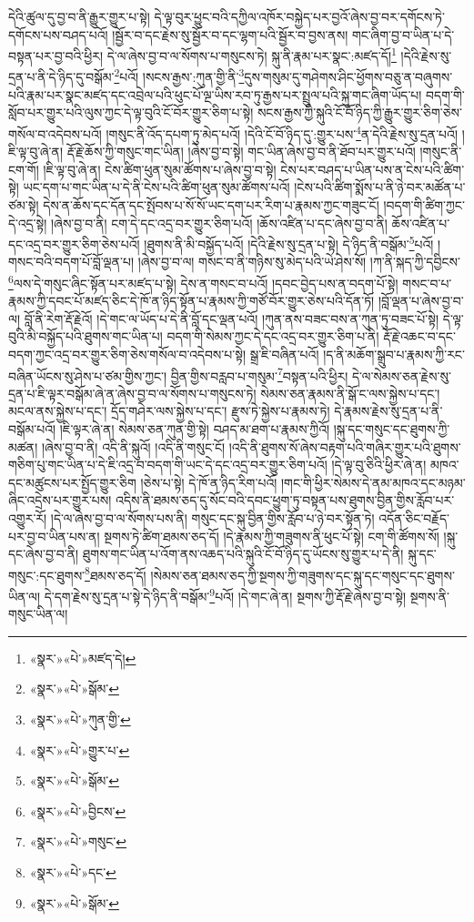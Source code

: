 དེའི་ཚུལ་དུ་བྱ་བ་ནི་རྒྱུར་གྱུར་པ་སྟེ། དེ་ལྟ་བུར་ཕྱུང་བའི་དཀྱིལ་འཁོར་བསྐྱེད་པར་བྱའོ་ཞེས་བྱ་བར་དགོངས་ཏེ་དགོངས་པས་བཤད་པའོ། །སྦྱོར་བ་དང་རྗེས་སུ་སྦྱོར་བ་དང་ལྷག་པའི་སྦྱོར་བ་བྱས་ནས། གང་ཞིག་བྱ་བ་ཡིན་པ་དེ་བསྟན་པར་བྱ་བའི་ཕྱིར། དེ་ལ་ཞེས་བྱ་བ་ལ་སོགས་པ་གསུངས་ཏེ། སྐུ་ནི་རྣམ་པར་སྣང་:མཛད་དོ།\footnote{«སྣར་»«པེ་»མཛད་དེ།} །དེའི་རྗེས་སུ་དྲན་པ་ནི་དེ་ཉིད་དུ་བསྒོམ་\footnote{«སྣར་»«པེ་»སྒོམ་}པའོ། །སངས་རྒྱས་:ཀུན་གྱི་ནི་\footnote{«སྣར་»«པེ་»ཀུན་གྱི་}དུས་གསུམ་དུ་གཤེགས་ཤིང་ཕྱོགས་བཅུ་ན་བཞུགས་པའི་རྣམ་པར་སྣང་མཛད་དང་འབྲེལ་པའི་ཕུང་པོ་ལྔ་ཡིས་རབ་ཏུ་རྒྱས་པར་སྤྲུལ་པའི་སྐུ་གང་ཞིག་ཡོད་པ། བདག་གི་སློབ་པར་གྱུར་པའི་ལུས་ཀྱང་དེ་ལྟ་བུའི་ངོ་བོར་གྱུར་ཅིག་པ་སྟེ། སངས་རྒྱས་ཀྱི་སྐུའི་ངོ་བོ་ཉིད་ཀྱི་རྒྱུར་གྱུར་ཅིག་ཅེས་གསོལ་བ་འདེབས་པའོ། །གསུང་ནི་འོད་དཔག་ཏུ་མེད་པའོ། །དེའི་ངོ་བོ་ཉིད་དུ་:གྱུར་པས་\footnote{«སྣར་»«པེ་»གྱུར་པ་}ན་དེའི་རྗེས་སུ་དྲན་པའོ། །ཇི་ལྟ་བུ་ཞེ་ན། རྡོ་རྗེ་ཆོས་ཀྱི་གསུང་གང་ཡིན། །ཞེས་བྱ་བ་སྟེ། གང་ཡིན་ཞེས་བྱ་བ་ནི་ཐོབ་པར་གྱུར་པའོ། །གསུང་ནི་ངག་གོ། །ཇི་ལྟ་བུ་ཞེ་ན། ངེས་ཚིག་ཕུན་སུམ་ཚོགས་པ་ཞེས་བྱ་བ་སྟེ། ངེས་པར་བཤད་པ་ཡིན་པས་ན་ངེས་པའི་ཚིག་སྟེ། ཡང་དག་པ་གང་ཡིན་པ་དེ་ནི་ངེས་པའི་ཚིག་ཕུན་སུམ་ཚོགས་པའོ། །ངེས་པའི་ཚིག་སྨོས་པ་ནི་ཉེ་བར་མཚོན་པ་ཙམ་སྟེ། དེས་ན་ཆོས་དང་དོན་དང་སྤོབས་པ་སོ་སོ་ཡང་དག་པར་རིག་པ་རྣམས་ཀྱང་གཟུང་ངོ། །བདག་གི་ཚིག་ཀྱང་དེ་འདྲ་སྟེ། །ཞེས་བྱ་བ་ནི། ངག་དེ་དང་འདྲ་བར་གྱུར་ཅིག་པའོ། །ཆོས་འཛིན་པ་དང་ཞེས་བྱ་བ་ནི། ཆོས་འཛིན་པ་དང་འདྲ་བར་གྱུར་ཅིག་ཅེས་པའོ། །ཐུགས་ནི་མི་བསྐྱོད་པའོ། །དེའི་རྗེས་སུ་དྲན་པ་སྟེ། དེ་ཉིད་ནི་བསྒོམ་\footnote{«སྣར་»«པེ་»སྒོམ་}པའོ། །གསང་བའི་བདག་པོ་བློ་ལྡན་པ། །ཞེས་བྱ་བ་ལ། གསང་བ་ནི་གཉིས་སུ་མེད་པའི་ཡེ་ཤེས་སོ། །ཀ་ནི་སྐད་ཀྱི་དབྱིངས་\footnote{«སྣར་»«པེ་»བྱིངས་}ལས་དེ་གསུང་ཞིང་སྟོན་པར་མཛད་པ་སྟེ། དེས་ན་གསང་བ་པའོ། །དབང་བྱེད་པས་ན་བདག་པོ་སྟེ། གསང་བ་པ་རྣམས་ཀྱི་དབང་པོ་མཛད་ཅིང་དེ་ཁོ་ན་ཉིད་སྟོན་པ་རྣམས་ཀྱི་གཙོ་བོར་གྱུར་ཅེས་པའི་དོན་ཏོ། །བློ་ལྡན་པ་ཞེས་བྱ་བ་ལ། བློ་ནི་རེག་རྡོ་རྗེའོ། །དེ་གང་ལ་ཡོད་པ་དེ་ནི་བློ་དང་ལྡན་པའོ། །ཀུན་ནས་བཟང་བས་ན་ཀུན་ཏུ་བཟང་པོ་སྟེ། དེ་ལྟ་བུའི་མི་བསྐྱོད་པའི་ཐུགས་གང་ཡིན་པ། བདག་གི་སེམས་ཀྱང་དེ་དང་འདྲ་བར་གྱུར་ཅིག་པ་ནི། རྡོ་རྗེ་འཆང་བ་དང་བདག་ཀྱང་འདྲ་བར་གྱུར་ཅིག་ཅེས་གསོལ་བ་འདེབས་པ་སྟེ། སྒྲ་ཇི་བཞིན་པའོ། །ད་ནི་མཆོག་སྒྲུབ་པ་རྣམས་ཀྱི་རང་བཞིན་ཡོངས་སུ་ཤེས་པ་ཙམ་གྱིས་ཀྱང་། བྱིན་གྱིས་བརླབ་པ་གསུམ་\footnote{«སྣར་»«པེ་»གསུང་}བསྟན་པའི་ཕྱིར། དེ་ལ་སེམས་ཅན་རྗེས་སུ་དྲན་པ་ཇི་ལྟར་བསྒོམ་ཞེ་ན་ཞེས་བྱ་བ་ལ་སོགས་པ་གསུངས་ཏེ། སེམས་ཅན་རྣམས་ནི་སྒོ་ང་ལས་སྐྱེས་པ་དང་། མངལ་ནས་སྐྱེས་པ་དང་། དྲོད་གཤེར་ལས་སྐྱེས་པ་དང་། རྫུས་ཏེ་སྐྱེས་པ་རྣམས་ཏེ། དེ་རྣམས་རྗེས་སུ་དྲན་པ་ནི་བསྒོམ་པའོ། །ཇི་ལྟར་ཞེ་ན། སེམས་ཅན་ཀུན་གྱི་སྟེ། བཤད་མ་ཐག་པ་རྣམས་ཀྱིའོ། །སྐུ་དང་གསུང་དང་ཐུགས་ཀྱི་མཚན། །ཞེས་བྱ་བ་ནི། འདི་ནི་སྐུའོ། །འདི་ནི་གསུང་ངོ། །འདི་ནི་ཐུགས་སོ་ཞེས་བརྟག་པའི་གཞིར་གྱུར་པའི་ཐུགས་གཅིག་པུ་གང་ཡིན་པ་དེ་ཇི་འདྲ་བ་བདག་གི་ཡང་དེ་དང་འདྲ་བར་གྱུར་ཅིག་པའོ། །དེ་ལྟ་བུ་ཅིའི་ཕྱིར་ཞེ་ན། མཁའ་དང་མཚུངས་པར་སྤྱོད་གྱུར་ཅིག །ཅེས་པ་སྟེ། དེ་ཁོ་ན་ཉིད་རིག་པའོ། །གང་གི་ཕྱིར་སེམས་དེ་ནམ་མཁའ་དང་མཉམ་ཞིང་འདྲེས་པར་གྱུར་པས། འདིས་ནི་ཐམས་ཅད་དུ་སོང་བའི་དབང་ཕྱུག་ཏུ་བསྟན་པས་ཐུགས་བྱིན་གྱིས་རློབ་པར་འགྱུར་རོ། །དེ་ལ་ཞེས་བྱ་བ་ལ་སོགས་པས་ནི། གསུང་དང་སྐུ་བྱིན་གྱིས་རློབ་པ་ཉེ་བར་སྟོན་ཏེ། འདོན་ཅིང་བརྗོད་པར་བྱ་བ་ཡིན་པས་ན། སྔགས་ཏེ་ཚིག་ཐམས་ཅད་དོ། །དེ་རྣམས་ཀྱི་གཟུགས་ནི་ཕུང་པོ་སྟེ། ངག་གི་ཚོགས་སོ། །སྐུ་དང་ཞེས་བྱ་བ་ནི། ཐུགས་གང་ཡིན་པ་འོག་ནས་འཆད་པའི་སྐུའི་ངོ་བོ་ཉིད་དུ་ཡོངས་སུ་གྱུར་པ་དེ་ནི། སྐུ་དང་གསུང་:དང་ཐུགས་\footnote{«སྣར་»«པེ་»དང་}ཐམས་ཅད་དོ། །སེམས་ཅན་ཐམས་ཅད་ཀྱི་སྔགས་ཀྱི་གཟུགས་དང་སྐུ་དང་གསུང་དང་ཐུགས་ཡིན་ལ། དེ་དག་རྗེས་སུ་དྲན་པ་སྟེ་དེ་ཉིད་ནི་བསྒོམ་\footnote{«སྣར་»«པེ་»སྒོམ་}པའོ། །དེ་གང་ཞེ་ན། སྔགས་ཀྱི་རྡོ་རྗེ་ཞེས་བྱ་བ་སྟེ། སྔགས་ནི་གསུང་ཡིན་ལ། 